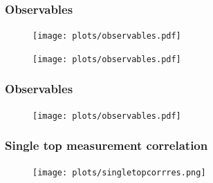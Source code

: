 \documentclass{beamer}
\begin{document}
\begin{frame}
\frametitle{Observables}
\begin{minipage}{0.49\textwidth}
	\begin{figure}

		\texttt{[image: plots/observables.pdf]}
	\end{figure}
\end{minipage}
\hfill
\begin{minipage}{0.49\textwidth}
	\begin{figure}

		\texttt{[image: plots/observables.pdf]}
	\end{figure}
\end{minipage}
\end{frame}

\begin{frame}
\frametitle{Observables}
	\begin{figure}
		\centering
		\texttt{[image: plots/observables.pdf]}
	\end{figure}
\end{frame}

\LogoOff
\begin{frame}
\frametitle{Single top measurement correlation}
	\begin{figure}
		\centering
		\texttt{[image: plots/singletopcorrres.png]}
	\end{figure}
\end{frame}
\LogoOn

\backupend
\end{document}

